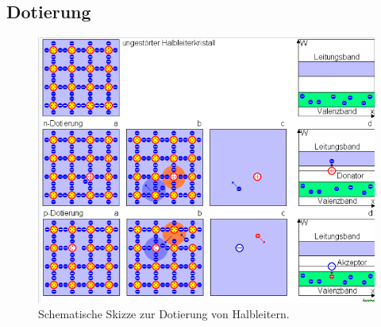 \subsection{Dotierung}
\label{sub:Dotierung}

\begin{figure}[H]
    \centering
    \includegraphics[scale=0.7]{Abbildungen/Dotierung.png}
    \caption{Schematische Skizze zur Dotierung von Halbleitern.\cite{Dotierung}}
    \label{fig:Dotierung}
\end{figure}


